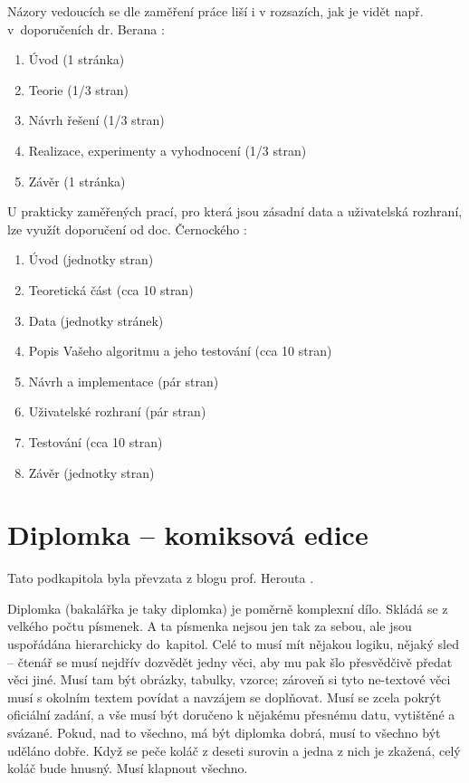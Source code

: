 Názory vedoucích se dle zaměření práce liší i v rozsazích, jak je vidět např. v~doporučeních dr. Berana \cite{Beran}:
\begin{enumerate}
  \item{Úvod (1 stránka)}
  \item{Teorie (1/3 stran)}
  \item{Návrh řešení (1/3 stran)}
  \item{Realizace, experimenty a vyhodnocení (1/3 stran)}
  \item{Závěr (1 stránka)}
\end{enumerate}

U prakticky zaměřených prací, pro která jsou zásadní data a uživatelská rozhraní, lze využít doporučení od doc. Černockého \cite{Cernocky}:
\begin{enumerate}
  \item{Úvod (jednotky stran)}
  \item{Teoretická část (cca 10 stran)}
  \item{Data (jednotky stránek)}
  \item{Popis Vašeho algoritmu a jeho testování (cca 10 stran)}
  \item{Návrh a implementace (pár stran)}
  \item{Uživatelské rozhraní (pár stran)}
  \item{Testování (cca 10 stran)}
  \item{Závěr (jednotky stran)}
\end{enumerate}

\section{Diplomka -- komiksová edice}
Tato podkapitola byla převzata z blogu prof. Herouta \cite{Herout}.

Diplomka (bakalářka je taky diplomka) je poměrně komplexní dílo. Skládá se z velkého počtu písmenek. A ta písmenka nejsou jen tak za sebou, ale jsou uspořádána hierarchicky do~kapitol. Celé to musí mít nějakou logiku, nějaký sled -- čtenář se musí nejdřív dozvědět jedny věci, aby mu pak šlo přesvědčivě předat věci jiné. Musí tam být obrázky, tabulky, vzorce; zároveň si tyto ne-textové věci musí s okolním textem povídat a navzájem se doplňovat. Musí se zcela pokrýt oficiální zadání, a vše musí být doručeno k nějakému přesnému datu, vytištěné a svázané. Pokud, nad to všechno, má být diplomka dobrá, musí to všechno být uděláno dobře. Když se peče koláč z deseti surovin a jedna z nich je zkažená, celý koláč bude hnusný. Musí klapnout všechno.

